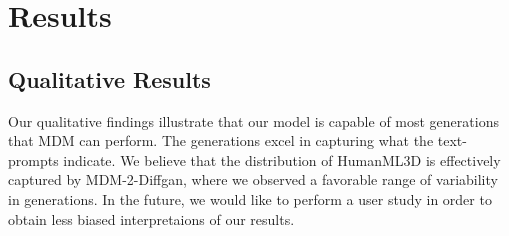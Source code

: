 \documentclass[10pt,twocolumn,letterpaper]{article}
\begin{document}
\section{Results}
\label{sec:results}
\subsection{Qualitative Results}

Our qualitative findings illustrate that our model is capable of most generations that MDM can perform. The generations excel in capturing what the text-prompts 
indicate. We believe that the distribution of HumanML3D is effectively captured by MDM-2-Diffgan, where we observed a favorable range of variability in generations. 
In the future, we would like to perform a user study in order to obtain less biased interpretaions of our results. 
\end{document}
